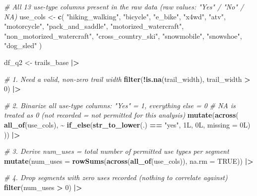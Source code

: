 \documentclass[
]{article}
\newenvironment{Shaded}{\begin{snugshade}}{\end{snugshade}}
\newcommand{\AttributeTok}[1]{\textcolor[rgb]{0.13,0.29,0.53}{#1}}
\newcommand{\CommentTok}[1]{\textcolor[rgb]{0.56,0.35,0.01}{\textit{#1}}}
\newcommand{\ConstantTok}[1]{\textcolor[rgb]{0.56,0.35,0.01}{#1}}
\newcommand{\DataTypeTok}[1]{\textcolor[rgb]{0.13,0.29,0.53}{#1}}
\newcommand{\DecValTok}[1]{\textcolor[rgb]{0.00,0.00,0.81}{#1}}
\newcommand{\FunctionTok}[1]{\textcolor[rgb]{0.13,0.29,0.53}{\textbf{#1}}}
\newcommand{\NormalTok}[1]{#1}
\newcommand{\OtherTok}[1]{\textcolor[rgb]{0.56,0.35,0.01}{#1}}
\newcommand{\SpecialCharTok}[1]{\textcolor[rgb]{0.81,0.36,0.00}{\textbf{#1}}}
\newcommand{\StringTok}[1]{\textcolor[rgb]{0.31,0.60,0.02}{#1}}
\begin{document}
\begin{Shaded}
\begin{Highlighting}[]
\CommentTok{\# All 13 use{-}type columns present in the raw data (raw values: "Yes" / "No" / NA)}
\NormalTok{use\_cols }\OtherTok{\textless{}{-}} \FunctionTok{c}\NormalTok{(}
  \StringTok{"hiking\_walking"}\NormalTok{, }\StringTok{"bicycle"}\NormalTok{, }\StringTok{"e\_bike"}\NormalTok{,}
  \StringTok{"x4wd"}\NormalTok{, }\StringTok{"atv"}\NormalTok{, }\StringTok{"motorcycle"}\NormalTok{,}
  \StringTok{"pack\_and\_saddle"}\NormalTok{,}
  \StringTok{"motorized\_watercraft"}\NormalTok{, }\StringTok{"non\_motorized\_watercraft"}\NormalTok{,}
  \StringTok{"cross\_country\_ski"}\NormalTok{, }\StringTok{"snowmobile"}\NormalTok{, }\StringTok{"snowshoe"}\NormalTok{, }\StringTok{"dog\_sled"}
\NormalTok{)}

\NormalTok{df\_q2 }\OtherTok{\textless{}{-}}\NormalTok{ trails\_base }\SpecialCharTok{|\textgreater{}}
  
  \CommentTok{\# 1. Need a valid, non{-}zero trail width}
  \FunctionTok{filter}\NormalTok{(}\SpecialCharTok{!}\FunctionTok{is.na}\NormalTok{(trail\_width), trail\_width }\SpecialCharTok{\textgreater{}} \DecValTok{0}\NormalTok{) }\SpecialCharTok{|\textgreater{}}
  
  \CommentTok{\# 2. Binarize all use{-}type columns: "Yes" = 1, everything else = 0}
  \CommentTok{\#    NA is treated as 0 (not recorded = not permitted for this analysis)}
  \FunctionTok{mutate}\NormalTok{(}\FunctionTok{across}\NormalTok{(}
    \FunctionTok{all\_of}\NormalTok{(use\_cols),}
    \SpecialCharTok{\textasciitilde{}} \FunctionTok{if\_else}\NormalTok{(}\FunctionTok{str\_to\_lower}\NormalTok{(.) }\SpecialCharTok{==} \StringTok{"yes"}\NormalTok{, }\DecValTok{1}\DataTypeTok{L}\NormalTok{, }\DecValTok{0}\DataTypeTok{L}\NormalTok{, }\AttributeTok{missing =} \DecValTok{0}\DataTypeTok{L}\NormalTok{)}
\NormalTok{  )) }\SpecialCharTok{|\textgreater{}}
  
  \CommentTok{\# 3. Derive num\_uses = total number of permitted use types per segment}
  \FunctionTok{mutate}\NormalTok{(}\AttributeTok{num\_uses =} \FunctionTok{rowSums}\NormalTok{(}\FunctionTok{across}\NormalTok{(}\FunctionTok{all\_of}\NormalTok{(use\_cols)), }\AttributeTok{na.rm =} \ConstantTok{TRUE}\NormalTok{)) }\SpecialCharTok{|\textgreater{}}
  
  \CommentTok{\# 4. Drop segments with zero uses recorded (nothing to correlate against)}
  \FunctionTok{filter}\NormalTok{(num\_uses }\SpecialCharTok{\textgreater{}} \DecValTok{0}\NormalTok{) }\SpecialCharTok{|\textgreater{}}
  

\end{Highlighting}
\end{Shaded}
\end{document}
